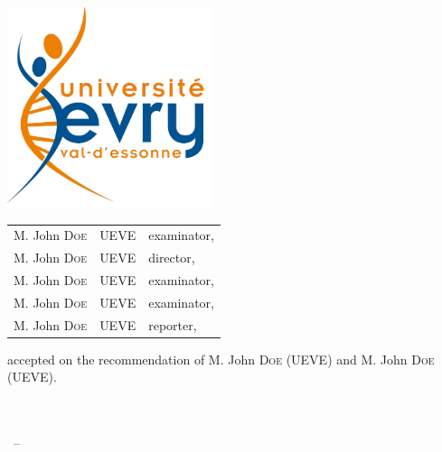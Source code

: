 \begin{titlepage}
\begin{addmargin}[-1cm]{-3cm}
\begin{center}
\includegraphics[width=6cm]{gfx/University_of_Evry_Val_d_Essonne_logo} \\ \medskip %
\vfill
\begin{center}
\begin{tabularx}{\textwidth}{XXX}
M. John \textsc{Doe} & UEVE & examinator, \\
M. John \textsc{Doe} & UEVE & director, \\
M. John \textsc{Doe} & UEVE & examinator, \\
M. John \textsc{Doe} & UEVE & examinator, \\
M. John \textsc{Doe} & UEVE & reporter, \\
\end{tabularx}
\end{center}
\medskip
accepted on the recommendation of M. John \textsc{Doe} (UEVE) and M. John \textsc{Doe} (UEVE).
\vfill
\myDepartment \\
\myFaculty \\
\myUni \\ \bigskip

\myTime\ -- \myVersion %

\vfill

\end{center}
\end{addmargin}

\renewcommand*{\thefootnote}{\arabic{footnote}}
\setcounter{footnote}{0}
\end{titlepage}